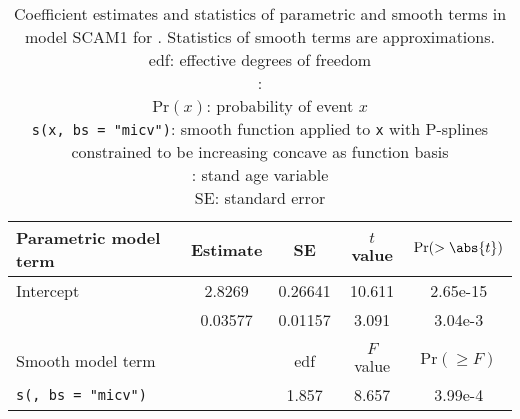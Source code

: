 \begin{singlespace}
  \begin{table}[h]
    \caption{Coefficient estimates and statistics of parametric and smooth terms in model SCAM1 for \Beech{}.  Statistics of smooth terms are approximations. \\
      edf: effective degrees of freedom \\
      \texttt{\ProductivityIndexVariableR{}}: \ProductivityIndexVariableText{} \\
      \(\text{Pr}(x)\): probability of event \(x\) \\
      \texttt{s(x, bs = "micv")}: smooth function applied to \texttt{x} with P-splines constrained to be increasing concave as function basis \\
      \texttt{\StandAgeVariableR{}}: stand age variable \\
      SE: standard error}
    \label{tab:StatisticsSCAM1Beech}
    {\tabulinesep=2mm
      \begin{tabu}{L
          S[table-format = 1.5]
          S[table-format = 1.5]
          S[table-format = 2.3]
          S[table-format = 1.2e-2]
        }
        \toprule
        Parametric model term & {Estimate} & {SE} & {\(t\) value} & {\(\text{Pr}(> \abs{t})\)} \\
        \midrule
        Intercept & 2.8269 & 0.26641 & 10.611 & 2.65e-15 \\
        \texttt{\ProductivityIndexVariableR{}} & 0.03577 & 0.01157 & 3.091 & 3.04e-3 \\
        \\
        Smooth model term &  & {edf} & {\(F\) value} & {\(\text{Pr}(\geq F)\)} \\
        \midrule
        \texttt{s(\StandAgeVariableR{}, bs = "micv")} & & 1.857 & 8.657 & 3.99e-4 \\
        \bottomrule
      \end{tabu}
    }
  \end{table}
\end{singlespace}

